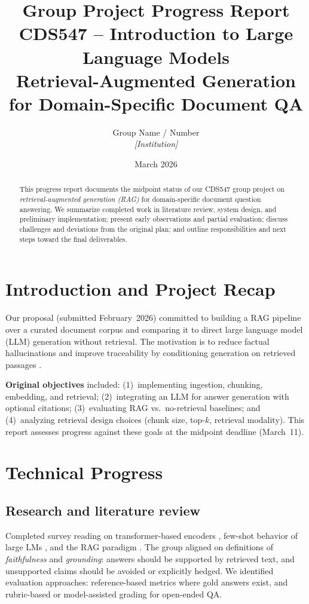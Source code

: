 \documentclass[11pt,a4paper]{article}
\title{\textbf{Group Project Progress Report}\\
\large CDS547 -- Introduction to Large Language Models\\
\large Retrieval-Augmented Generation for Domain-Specific Document QA}
\author{Group Name / Number \quad [Replace with member names]\\
\textit{[Institution]}}
\date{March 2026}
\begin{document}
\maketitle

\begin{abstract}
This progress report documents the midpoint status of our CDS547 group project on \emph{retrieval-augmented generation (RAG)} for domain-specific document question answering. We summarize completed work in literature review, system design, and preliminary implementation; present early observations and partial evaluation; discuss challenges and deviations from the original plan; and outline responsibilities and next steps toward the final deliverables.
\end{abstract}

\section{Introduction and Project Recap}
Our proposal (submitted February~2026) committed to building a RAG pipeline over a curated document corpus and comparing it to direct large language model (LLM) generation without retrieval. The motivation is to reduce factual hallucinations and improve traceability by conditioning generation on retrieved passages \cite{lewis2020retrieval}.

\textbf{Original objectives} included: (1)~implementing ingestion, chunking, embedding, and retrieval; (2)~integrating an LLM for answer generation with optional citations; (3)~evaluating RAG vs.\ no-retrieval baselines; and (4)~analyzing retrieval design choices (chunk size, top-$k$, retrieval modality). This report assesses progress against these goals at the midpoint deadline (March~11).

\section{Technical Progress}

\subsection{Research and literature review}
Completed survey reading on transformer-based encoders \cite{vaswani2017attention,devlin2019bert}, few-shot behavior of large LMs \cite{brown2020language}, and the RAG paradigm \cite{lewis2020retrieval}. The group aligned on definitions of \emph{faithfulness} and \emph{grounding}: answers should be supported by retrieved text, and unsupported claims should be avoided or explicitly hedged. We identified evaluation approaches: reference-based metrics where gold answers exist, and rubric-based or model-assisted grading for open-ended QA.
\end{document}
